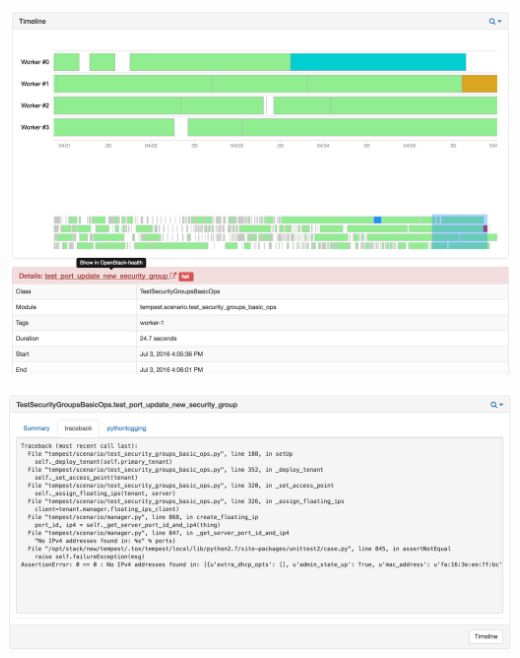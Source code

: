 \documentclass[aspectratio=169,11pt,hyperref={colorlinks=true}]{beamer}
\begin{document}
\begin{frame}
  \begin{center}
    \includegraphics[width=1.3\textheight]{stackviz-sample-timeline.png}
  \end{center}
\end{frame}

\begin{frame}
  \begin{center}
    \includegraphics[width=1.3\textheight]{stackviz-sample-traceback.png}
  \end{center}
\end{frame}
\end{document}
